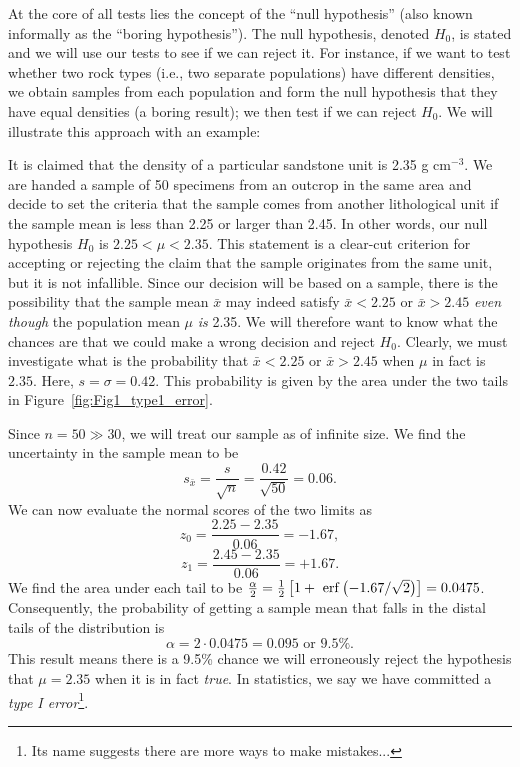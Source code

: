 	At the core of all tests lies the concept of the ``null hypothesis'' (also
known informally as the ``boring hypothesis'').  The null hypothesis,
denoted $H_0$, is stated and we will use our tests to see if we can reject it.  For instance, if 
we want to test whether two rock types (i.e., two separate populations) have different densities, we 
obtain samples from each population and form the null hypothesis 
that they have equal densities (a boring result); we then test if we can reject $H_0$.
We will illustrate this approach with an 
example:
\begin{example}
	It is claimed that the density of a particular sandstone unit is 
2.35 g cm$^{-3}$.  We are handed a sample 
of 50 specimens from an outcrop in the same area and decide to set the criteria that the sample 
comes from another lithological unit if the sample mean is less than 2.25 or larger than 2.45.  In other
words, our null hypothesis $H_0$ is $2.25 < \mu < 2.35$.  This statement is 
a clear-cut criterion for accepting or rejecting the claim that the sample originates from the same unit, 
but it is not infallible.  Since our decision will be based on a sample, there is the possibility that 
the sample mean $\bar{x}$ may indeed satisfy $\bar{x} < 2.25$ or $\bar{x} > 2.45$ \emph{even though} the
population mean $\mu$ \emph{is} 2.35.  We will 
therefore want to know what the chances are that we could make a wrong decision and reject $H_0$.
Clearly, we must investigate what is the probability that $\bar{x} < 2.25$ or $\bar{x} > 2.45$ when $\mu$ in fact is $2.35$.  
Here, $s = \sigma = 0.42$.  This probability is given by the area under the two tails in 
Figure~\ref{fig:Fig1_type1_error}.


Since $n = 50 \gg 30$, we will treat our sample as of infinite size.  We find the uncertainty in the sample mean to be
\begin{equation}
s_{\bar{x}} = \frac{s}{\sqrt{n}} = \frac{0.42}{\sqrt{50}} = 0.06.	 
\end{equation}
We can now evaluate the normal scores of the two limits as
\begin{equation}
z_0 = \frac{2.25 - 2.35}{0.06} = -1.67,
\end{equation}
\begin{equation}
z_1 = \frac{2.45 - 2.35}{0.06} = + 1.67.
\end{equation}
We find the area under each tail to be $\frac{\alpha}{2} = \frac{1}{2} \left[ 1 + \ \operatorname{erf} \left ( -1.67 / \sqrt{2}\right) \right] = 0.0475$.
Consequently, the probability of getting a sample 
mean that falls in the distal tails of the distribution is
\begin{equation}
\alpha = 2 \cdot 0.0475 = 0.095 \mbox{ or } 9.5\%.
\end{equation}	 
This result means there is a 9.5\% chance we will erroneously reject the hypothesis that $\mu = 2.35$ 
when it is in fact \emph{true}.  In statistics, we say we have committed a
\emph{type I error}\footnote{Its name suggests there are more ways to make mistakes...}.
\end{example}

